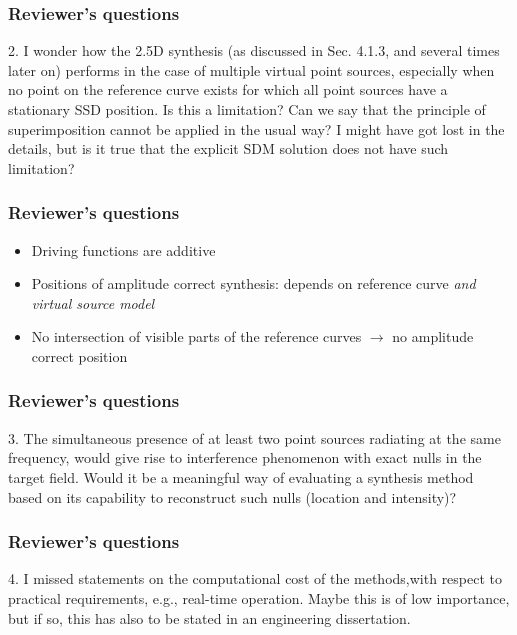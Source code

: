 \documentclass{beamer}
\begin{document}
\begin{frame}
\frametitle{Reviewer's questions}
2. I wonder how the 2.5D synthesis (as discussed in Sec. 4.1.3, and several times later on) performs in the case of multiple virtual point sources, especially when no point on the reference curve exists for which all point sources have a stationary SSD position. Is this a limitation? Can we say that the principle of superimposition cannot be applied in the usual way? I might have got lost in the details, but is it true that the explicit SDM solution does not have such limitation?
\end{frame}

\begin{frame}
\frametitle{Reviewer's questions}
\begin{itemize}
\item Driving functions are additive
\item Positions of amplitude correct synthesis: depends on reference curve \emph{and virtual source model}
\item No intersection of visible parts of the reference curves $\rightarrow$ no amplitude correct position
\end{itemize}
\begin{figure}
\end{figure}
\end{frame}


\begin{frame}
\frametitle{Reviewer's questions}
3. The simultaneous presence of at least two point sources radiating at the same frequency, would give rise to interference phenomenon with exact nulls in the target field. Would it be a meaningful way of evaluating a synthesis method based on its capability to reconstruct such nulls (location and intensity)?
\end{frame}

\begin{frame}
\frametitle{Reviewer's questions}
4. I missed statements on the computational cost of the methods,with respect to practical requirements, e.g., real-time operation. Maybe this is of low importance, but if so, this has also to be stated in an engineering dissertation.
\end{frame}
\end{document}
